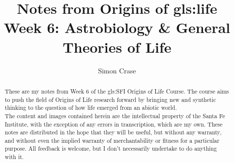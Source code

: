 \documentclass[]{article}
\title{
	Notes from Origins of \gls{gls:life}\\
	Week 6: Astrobiology \& General Theories of Life
}
\author{Simon Crase}
\begin{document}
\maketitle

\begin{abstract}
      These are my notes from Week 6 of the \gls{gls:SFI} Origins of Life Course\cite{sfi2019}. The course aims to push the field of Origins of Life research forward by bringing new and synthetic thinking to the question of how life emerged from an abiotic world.\\
   The content and images contained herein are the intellectual property of the Santa Fe Institute, with the exception of any errors in transcription, which are my own.
   These notes are distributed in the hope that they will be useful,
   but without any warranty, and without even the implied warranty of
   merchantability or fitness for a particular purpose. All feedback is welcome,
   but I don't necessarily undertake to do anything with it.

\end{abstract}

\setcounter{tocdepth}{2}
\tableofcontents





\printglossaries

 


\end{document}

